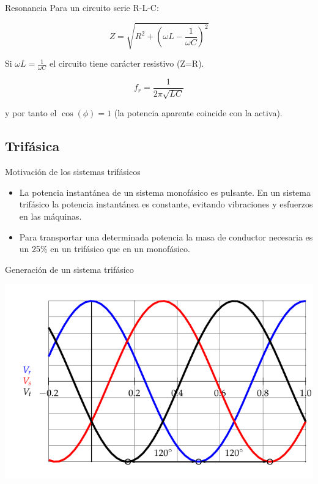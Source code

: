 \documentclass[xcolor={usenames,svgnames,dvipsnames}]{beamer}
\begin{document}
\begin{frame}[label={sec:orge4c3cfe}]{Resonancia}
Para un circuito serie R-L-C:

$$Z=\sqrt{R^{2}+\left(\omega L-\frac{1}{\omega C}\right)^{2}}$$

Si \(\omega L=\frac{1}{\omega C}\) el circuito tiene carácter resistivo
(Z=R).

$$f_{r}=\frac{1}{2\pi\sqrt{LC}}$$

y por tanto el \(\cos(\phi)=1\) (la potencia aparente coincide con la
activa).
\end{frame}

\subsection{Trifásica}
\label{sec:org00ebd1f}
\begin{frame}[label={sec:org8f098ff}]{Motivación de los sistemas trifásicos}
\begin{itemize}
\item La potencia instantánea de un sistema monofásico es pulsante. En un
sistema trifásico la potencia instantánea es constante, evitando
vibraciones y esfuerzos en las máquinas.

\item Para transportar una determinada potencia la masa de conductor
necesaria es un 25\% en un trifásico que en un monofásico.
\end{itemize}
\end{frame}

\begin{frame}[label={sec:orge307ebd}]{Generación de un sistema trifásico}
\begin{center}
\includegraphics[width=.9\linewidth]{../figs/TensionesTrifasica.pdf}
\end{center}
\end{frame}
\end{document}
